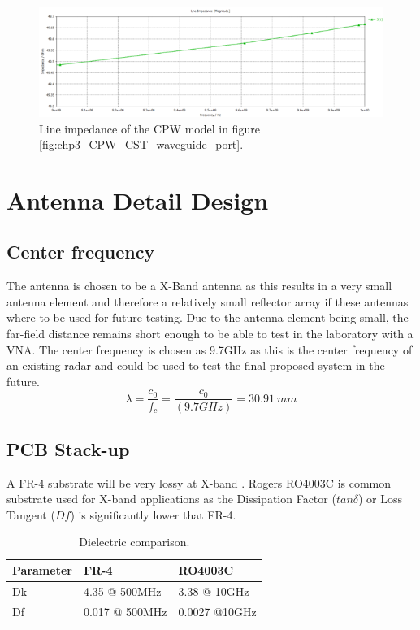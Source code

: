     \begin{figure}[H]
    \centering
    \includegraphics[width=0.9\linewidth]{Figures/chp3_CPW_CST_impedance.png}
    \caption{Line impedance of the CPW model in figure \ref{fig:chp3_CPW_CST_waveguide_port}.}
    \label{fig:chp3_CPW_CST_impedance}
    \end{figure}
    
\section{Antenna Detail Design}
\subsection{Center frequency}\label{sec:centerFreq}
The antenna is chosen to be a X-Band antenna as this results in a very small antenna element and therefore a relatively small reflector array if these antennas where to be used for future testing. Due to the antenna element being small, the far-field distance remains short enough to be able to test in the laboratory with a VNA. The center frequency is chosen as 9.7GHz as this is the center frequency of an existing radar and could be used to test the final proposed system in the future. 
    \[\lambda=\frac{c_0}{f_c}=\frac{c_0}{\left(9.7GHz\right)}=30.91\ mm\]

\subsection{PCB Stack-up}
A FR-4 substrate will be very lossy at X-band \cite{Substrate}. Rogers RO4003C is common substrate used for X-band applications as the Dissipation Factor (\(tan\delta\)) or Loss Tangent (\(Df\)) is significantly lower that FR-4.

    \begin{table}[H]
    \centering
    \caption{Dielectric comparison.}
    \begin{tabular}{|l|l|l|} 
    \hline
    \textbf{Parameter} & \textbf{FR-4}    & \textbf{RO4003C}  \\ 
    \hline
    Dk                 & 4.35 @ 500MHz    & 3.38 @ 10GHz      \\ 
    \hline
    Df                 & 0.017 @ 500MHz & 0.0027 @10GHz     \\
    \hline
    \end{tabular}
    \label{tab:PVresults}
    \end{table}

